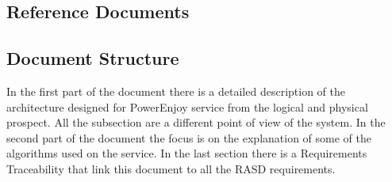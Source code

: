 \subsection{Reference Documents}
\subsection{Document Structure }
In the first part of the document there is a detailed description of the architecture designed for PowerEnjoy service from the logical and physical prospect. All the subsection are a different point of view of the system.
In the second part of the document the focus is on the explanation of some of the algorithms used on the service. In the last section there is a Requirements Traceability that link this document to all the RASD requirements.


\newpage